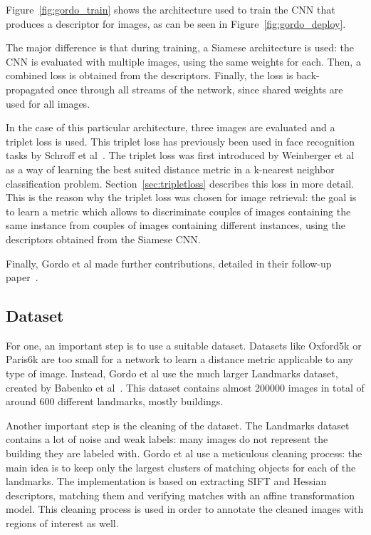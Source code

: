 Figure~\ref{fig:gordo_train} shows the architecture used to train the CNN
that produces a descriptor for images, as can be seen in
Figure~\ref{fig:gordo_deploy}.

The major difference is that during training, a Siamese architecture is
used: the CNN is evaluated with multiple images, using the same weights
for each. Then, a combined loss is obtained from the descriptors.
Finally, the loss is back-propagated once through all streams of the network,
since shared weights are used for all images.

In the case of this particular architecture, three images are evaluated
and a triplet loss is used. This triplet loss has previously been used
in face recognition tasks by Schroff et al~\cite{schroff_facenet:_2015}.
The triplet loss was first introduced by
Weinberger et al~\cite{weinberger_distance_2006} as a way of learning
the best suited distance metric in a k-nearest neighbor classification
problem. Section~\ref{sec:tripletloss} describes this loss in more detail.
This is the reason why the triplet loss was chosen for image retrieval:
the goal is to learn a metric which allows to discriminate couples of
images containing the same instance from couples of images containing
different instances, using the descriptors obtained from the Siamese
CNN.

Finally, Gordo et al made further contributions, detailed in their
follow-up paper~\cite{gordo_end--end_2016}.
\subsection{Dataset}
For one, an important step is to use a suitable dataset. Datasets like
Oxford5k or Paris6k are too small for a network to learn a distance metric
applicable to any type of image. Instead, Gordo et al use the much larger
Landmarks dataset, created by Babenko et al~\cite{babenko_neural_2014}.
This dataset contains almost 200000 images in total of around 600
different landmarks, mostly buildings.

Another important step is the cleaning of the dataset. The Landmarks
dataset contains a lot of noise and weak labels: many images do not
represent the building they are labeled with. Gordo et al use a meticulous
cleaning process: the main idea is to keep only the largest clusters
of matching objects for each of the landmarks. The implementation is
based on extracting SIFT and Hessian descriptors,
matching them and verifying matches with an affine transformation model.
This cleaning process is used in order to annotate the cleaned images
with regions of interest as well.

